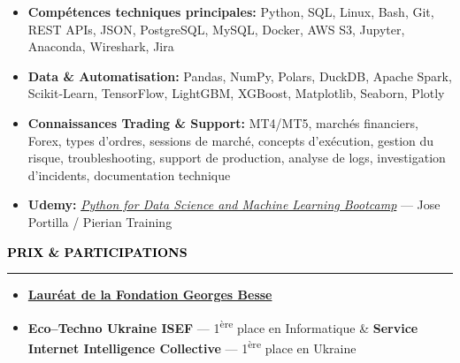 \documentclass[10pt,english,french]{article}
\newcommand{\awardIcon}[1][black]{\textcolor{#1}{\faTrophy}}
\newcommand{\cvsection}[1]{
    \vspace{4pt}
    \textbf{\fontsize{9pt}{10pt}\selectfont \textcolor{black}{#1}}
    \vspace{6pt}
    \hrule
    \vspace{6pt}
}
\begin{document}
\vspace{-4pt}
\begin{itemize}[leftmargin=0.5cm, label=\textbullet, itemsep=0.2em]
    \item \textbf{Compétences techniques principales\!:} Python, SQL, Linux, Bash, Git, REST APIs, JSON, PostgreSQL, MySQL, Docker, AWS S3, Jupyter, Anaconda, Wireshark, Jira
    \item \textbf{Data \& Automatisation\!:} Pandas, NumPy, Polars, DuckDB, Apache Spark, Scikit-Learn, TensorFlow, LightGBM, XGBoost, Matplotlib, Seaborn, Plotly
    \item \textbf{Connaissances Trading \& Support\!:} MT4/MT5, marchés financiers, Forex, types d'ordres, sessions de marché, concepts d'exécution, gestion du risque, troubleshooting, support de production, analyse de logs, investigation d'incidents, documentation technique
    \item \textbf{Udemy:} \href{https://www.udemy.com/certificate/UC-51319000-ccb8-4c9c-9320-6cd9860e601c/}{\textit{Python for Data Science and Machine Learning Bootcamp}} --- Jose Portilla / Pierian Training
\end{itemize}

\vspace{-3pt}
\cvsection{\awardIcon[black]\hspace{4pt}PRIX \& PARTICIPATIONS}

\vspace{-6pt}
\begin{itemize}[leftmargin=0.35cm, label=\textbullet, itemsep=0.15em]
    \item \textbf{\href{https://www.fondationbesse.com/}{Lauréat de la Fondation Georges Besse}}
    \item \textbf{Eco\hspace{3pt}--\hspace{3pt}Techno Ukraine ISEF} --- 1\textsuperscript{ère} place en Informatique \& \textbf{Service Internet Intelligence Collective} --- 1\textsuperscript{ère} place en Ukraine
\end{itemize}
\end{document}

